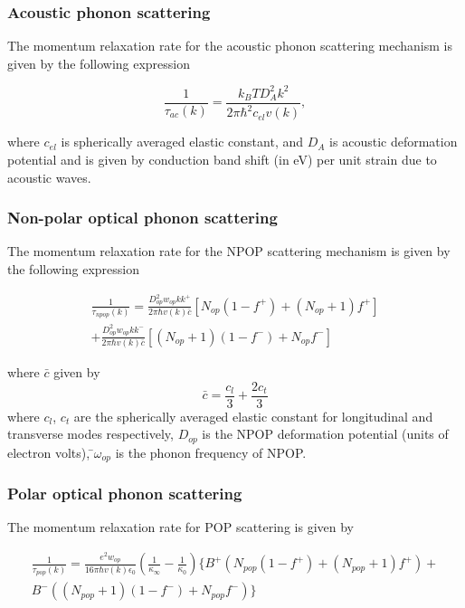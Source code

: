 \documentclass[12pt]{article}
\begin{document}
\subsubsection{Acoustic phonon scattering}
The momentum relaxation rate for the acoustic phonon scattering mechanism is given by the following expression \cite{ramu2011thermoelectric}

\begin{equation}
\frac{1}{\tau_{ac}(k)} = \frac{k_B T D_A^2 k^2}{2\pi\hbar^2 c_{el}v(k)} ,
\label{acoustic_deformation_p}
\end{equation}

where $c_{el}$ is spherically averaged elastic constant, and $D_A$ is acoustic deformation potential and is given by conduction band shift (in eV) per unit strain due to acoustic waves.

\subsubsection{Non-polar optical phonon scattering}
The momentum relaxation rate for the NPOP scattering mechanism is given by the following expression \cite{ramu2011thermoelectric} 

\begin{multline}
\frac{1}{\tau_{npop}(k)} = \frac{D_{op}^2 w_{op}kk^+}{2\pi \hbar v(k) \bar{c}} \left[ N_{op}(1-f^+) + (N_{op}+1) f^+ \right] \\ + \frac{D_{op}^2 w_{op}kk^-}{2\pi \hbar v(k) \bar{c}} \left[ (N_{op}+1)(1-f^-) + N_{op} f^- \right]
\label{npop_p}
\end{multline}

where $\bar{c}$  given by
\begin{equation}
\bar{c} = \frac{c_l}{3}  + \frac{2 c_t}{3}
\label{c_bar}
\end{equation}  
where $c_l$, $c_t$ are the spherically averaged elastic
constant for longitudinal and transverse modes respectively, $D_{op}$ is the NPOP deformation potential (units of electron volts),  ̄$\omega_{op}$  is the phonon frequency of NPOP.

\subsubsection{Polar optical phonon scattering}
The momentum relaxation rate for POP scattering is given by \cite{ramu2011thermoelectric} 

\begin{multline}
\frac{1}{\tau_{pop}(k)} =  \frac{e^2 w_{op}}{16\pi \hbar v(k) \epsilon_0}  \left( \frac{1}{\kappa_\infty} - \frac{1}{\kappa_0} \right) \{ B^+  \left( N_{pop}(1-f^+) + (N_{pop} +1) f^+ \right) + \\ B^- \left( (N_{pop}+1)(1-f^-) + N_{pop} f^- \right) \}
\label{pop_p}
\end{multline}
\end{document}
